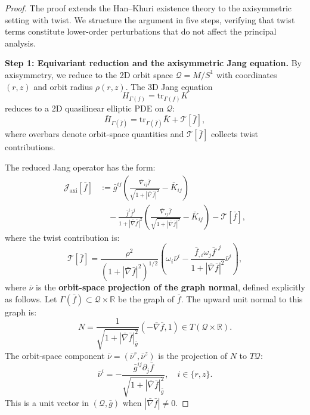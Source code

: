 \documentclass[12pt]{article}
\theoremstyle{plain}
\theoremstyle{definition}
\theoremstyle{remark}
\newcommand{\tr}{\mathrm{tr}}
\begin{document}
\begin{proof}
The proof extends the Han--Khuri existence theory \cite{hankhuri2013} to the axisymmetric setting with twist. We structure the argument in five steps, verifying that twist terms constitute lower-order perturbations that do not affect the principal analysis.

\textbf{Step 1: Equivariant reduction and the axisymmetric Jang equation.}
By axisymmetry, we reduce to the 2D orbit space $\mathcal{Q} = M/S^1$ with coordinates $(r, z)$ and orbit radius $\rho(r,z)$. The 3D Jang equation
\[
H_{\Gamma(f)} = \tr_{\Gamma(f)} K
\]
reduces to a 2D quasilinear elliptic PDE on $\mathcal{Q}$:
\begin{equation}\label{eq:reduced-jang}
\bar{H}_{\Gamma(\bar{f})} = \tr_{\Gamma(\bar{f})} \bar{K} + \mathcal{T}[\bar{f}],
\end{equation}
where overbars denote orbit-space quantities and $\mathcal{T}[\bar{f}]$ collects twist contributions.

The reduced Jang operator has the form:
\begin{align*}
\mathcal{J}_{\text{axi}}[\bar{f}] &:= \bar{g}^{ij}\left(\frac{\bar{\nabla}_{ij}\bar{f}}{\sqrt{1+|\bar{\nabla}\bar{f}|^2}} - \bar{K}_{ij}\right) \\
&\quad - \frac{\bar{f}^i\bar{f}^j}{1+|\bar{\nabla}\bar{f}|^2}\left(\frac{\bar{\nabla}_{ij}\bar{f}}{\sqrt{1+|\bar{\nabla}\bar{f}|^2}} - \bar{K}_{ij}\right) - \mathcal{T}[\bar{f}],
\end{align*}
where the twist contribution is:
\begin{equation}\label{eq:twist-term}
\mathcal{T}[\bar{f}] = \frac{\rho^2}{(1 + |\bar{\nabla} \bar{f}|^2)^{1/2}} \left( \omega_i \bar{\nu}^i - \frac{\bar{f}_{,i}\omega_j \bar{f}^{,j}}{1 + |\bar{\nabla} \bar{f}|^2}\bar{\nu}^i \right),
\end{equation}
where $\bar{\nu}$ is the \textbf{orbit-space projection of the graph normal}, defined explicitly as follows. Let $\Gamma(\bar{f}) \subset \mathcal{Q} \times \mathbb{R}$ be the graph of $\bar{f}$. The upward unit normal to this graph is:
\[
N = \frac{1}{\sqrt{1 + |\bar{\nabla}\bar{f}|^2_{\bar{g}}}}(-\bar{\nabla}\bar{f}, 1) \in T(\mathcal{Q} \times \mathbb{R}).
\]
The orbit-space component $\bar{\nu} = (\bar{\nu}^r, \bar{\nu}^z)$ is the projection of $N$ to $T\mathcal{Q}$:
\[
\bar{\nu}^i = -\frac{\bar{g}^{ij}\partial_j \bar{f}}{\sqrt{1 + |\bar{\nabla}\bar{f}|^2_{\bar{g}}}}, \quad i \in \{r, z\}.
\]
This is a unit vector in $(\mathcal{Q}, \bar{g})$ when $|\bar{\nabla}\bar{f}| \neq 0$.


\end{proof}
\end{document}
